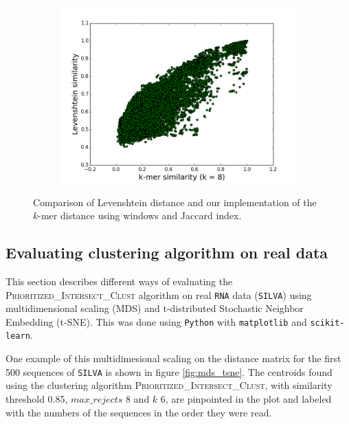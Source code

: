 \begin{figure}[H]
  \centering
  \begin{subfigure}[b]{0.5\textwidth}
    \includegraphics[scale=0.34]{graphics/k8.png}
  \end{subfigure}
  \caption{Comparison of Levenshtein distance and our implementation of the
  $k$-mer distance using windows and Jaccard index.}
  \label{fig:Levenshtein_vs_Kmer}
\end{figure}

\subsection{Evaluating clustering algorithm on real data}

This section describes different ways of evaluating the
\textsc{Prioritized\_Intersect\_Clust} algorithm on real \texttt{RNA} data
(\texttt{SILVA}) using multidimensional scaling (MDS) and t-distributed
Stochastic Neighbor Embedding (t-SNE). This was done using \texttt{Python} with
\texttt{matplotlib} and \texttt{scikit-learn}.

One example of this
multidimesional scaling on the distance matrix for the first 500 sequences of
\texttt{SILVA} is shown in figure \ref{fig:mds_tsne}. The centroids found using
the clustering algorithm \textsc{Prioritized\_Intersect\_Clust}, with similarity
threshold 0.85, $max\_rejects$ 8 and $k$ 6, are pinpointed in the plot and
labeled with the numbers of the sequences in the order they were read.

